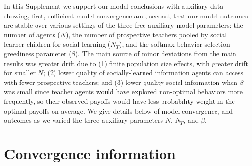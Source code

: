 \documentclass[letterpaper,11.5pt]{scrartcl}
\newcommand{\ps}[1]{{\textcolor{mygreen} {({\tiny PS:} #1)}}}
\begin{document}





In this Supplement we support our model conclusions with auxiliary data
showing, first, sufficient model convergence and, second, that our model
outcomes are stable over various settings of the three free auxiliary model
parameters: the number of agents ($N$), the number of
prospective teachers pooled by social learner children for social learning
($N_T$), and the softmax behavior selection greediness parameter ($\beta$).
The main source of minor deviations from the main results was greater drift
due to (1) finite population size effects, with greater drift for smaller $N$;
(2) lower quality of socially-learned information agents can access with fewer
prospective teachers; and (3) lower quality social information when $\beta$
was small since teacher agents would have explored non-optimal behaviors more
frequently, so their observed payoffs would have less probability weight in
the optimal payoffs on average. We give details below of model convergence, and
outcomes as we varied the three auxiliary parameters $N$, $N_T$, and $\beta$.


\section{Convergence information}
\end{document}

